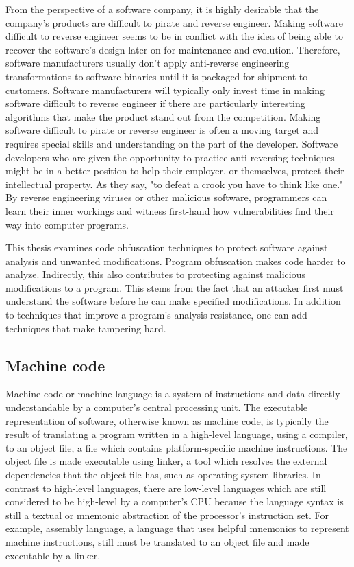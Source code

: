 \documentclass[a4paper,12pt]{article}
\begin{document}
From the perspective of a software company, it is highly desirable that the
company's products are difficult to pirate and reverse engineer. Making
software difficult to reverse engineer seems to be in conflict with the idea
of being able to recover the software's design later on for maintenance and
evolution. Therefore, software manufacturers usually don't apply anti-reverse
engineering transformations to software binaries until it is packaged for
shipment to customers. Software manufacturers will typically only invest time
in making software difficult to reverse engineer if there are particularly
interesting algorithms that make the product stand out from the competition.
Making software difficult to pirate or reverse engineer is often a moving
target and requires special skills and understanding on the part of the
developer. Software developers who are given the opportunity to practice
anti-reversing techniques might be in a better position to help their
employer, or themselves, protect their intellectual property. As they say,
"to defeat a crook you have to think like one." By reverse engineering
viruses or other malicious software, programmers can learn their inner
workings and witness first-hand how vulnerabilities find their way into
computer programs.

This thesis examines code obfuscation techniques to protect software against
analysis and unwanted modifications. Program obfuscation makes code harder
to analyze. Indirectly, this also contributes to protecting against malicious
modifications to a program. This stems from the fact that an attacker first
must understand the software before he can make specified modifications. In
addition to techniques that improve a program’s analysis resistance, one can
add techniques that make tampering hard.

\subsection{Machine code}
Machine code or machine language is a system of instructions and data directly
understandable by a computer's central processing unit.
The executable representation of software, otherwise known as machine code,
is typically the result of translating a program written in a high-level
language, using a compiler, to an object file, a file which contains
platform-specific machine instructions. The object file is made executable
using linker, a tool which resolves the external dependencies that the object
file has, such as operating system libraries. In contrast to high-level
languages, there are low-level languages which are still considered to be
high-level by a computer's CPU because the language syntax is still a textual
or mnemonic abstraction of the processor's instruction set. For example,
assembly language, a language that uses helpful mnemonics to represent
machine instructions, still must be translated to an object file and made
executable by a linker.
\end{document}
